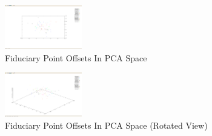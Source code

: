 \documentclass[12pt]{article}
\begin{document}
\begin{figure}
\centering
\includegraphics[width=0.30\textwidth]{problem1-fid-pca-1.png}
\caption{Fiduciary Point Offsets In PCA Space}
\label{pca1}
\end{figure}

\begin{figure}
\centering
\includegraphics[width=0.30\textwidth]{problem1-fid-pca-2.png}
\caption{Fiduciary Point Offsets In PCA Space (Rotated View)}
\label{pca2}
\end{figure}
\end{document}
